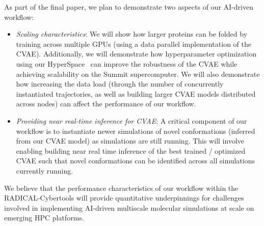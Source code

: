 As part of the final paper, we plan to demonstrate two aspects of our AI-driven workflow: 
\begin{itemize}
\item \emph{Scaling characteristics}: We will show how larger proteins can be folded by  training across multiple GPUs (using a data parallel implementation of the CVAE). Additionally, we will demonstrate how hyperparameter optimization using our HyperSpace~\cite{Young_2018} can improve the robustness of the CVAE while achieving scalability on the Summit supercomputer. We will also demonstrate how increasing the data load (through the number of concurrently instantiated trajectories, as well as building larger CVAE models distributed across nodes) can affect the performance of our workflow. 
\item \emph{Providing near real-time inference for CVAE}: A critical component of our workflow is to instantiate newer simulations of novel conformations (inferred from our CVAE model) as simulations are still running. This will involve enabling building near real time inference of the best trained / optimized CVAE such that novel conformations can be identified across all simulations currently running. 
\end{itemize}
We believe that the performance characteristics of our workflow within the
RADICAL-Cybertools will provide quantitative underpinnings for challenges
involved in implementing AI-driven multiscale molecular simulations at scale
on emerging HPC platforms.